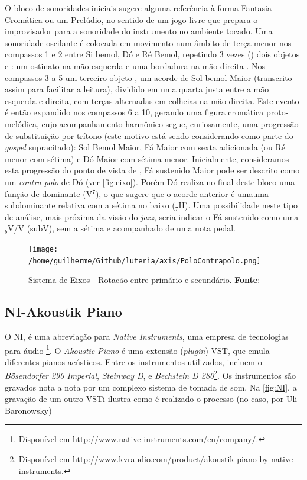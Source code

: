 O bloco de sonoridades iniciais  sugere alguma referência à forma Fantasia Cromática ou um Prelúdio, no sentido de um jogo livre que prepara o improvisador para a sonoridade do instrumento no ambiente tocado.  Uma sonoridade oscilante é colocada em movimento num âmbito de terça menor nos compassos 1 e 2 entre Si bemol, Dó e Ré Bemol, repetindo 3 vezes () dois objetos  e : um ostinato na mão esquerda e uma bordadura na mão direita . Nos compassos 3 a 5 um terceiro objeto , um acorde de Sol bemol Maior (transcrito assim para facilitar a leitura), dividido em uma quarta justa entre a mão esquerda e direita, com terças alternadas em colheias na mão direita. Este evento é então expandido nos compassos 6 a 10, gerando uma figura cromática proto-melódica, cujo acompanhamento harmônico segue, curiosamente, uma progressão de substituição por trítono (este motivo está sendo considerando como parte do  \emph{gospel} supracitado): Sol Bemol Maior, Fá Maior com sexta adicionada (ou Ré menor com sétima) e Dó Maior com sétima menor. Inicialmente, consideramos esta progressão do ponto de vista de , Fá sustenido Maior pode ser descrito como um \emph{contra-polo} de Dó (ver \autoref{fig:eixo}). Porém Dó realiza no final deste bloco uma função de dominante (V$^7$), o que sugere que o acorde anterior é umauma subdominante relativa com a sétima no baixo ($_7$II). Uma possibilidade neste tipo de análise, mais próxima da visão do \emph{jazz}, seria indicar o Fá sustenido como uma $_b$V/V (subV), sem a sétima e acompanhado de uma nota pedal. 

\begin{figure}[!h]
  \centering
  \texttt{[image: /home/guilherme/Github/luteria/axis/PoloContrapolo.png]}
  \caption{Sistema de Eixos - Rotacão entre primário e secundário. \textbf{Fonte}: }
  \label{fig:eixo}
\end{figure}

\subsection{NI-Akoustik Piano}\label{sec:NI}

O NI, é uma abreviação para \emph{Native Instruments}, uma empresa de tecnologias para áudio \footnote{Disponível em \url{http://www.native-instruments.com/en/company/}.}. O \emph{Akoustic Piano} é uma extensão (\emph{plugin}) VST, que emula diferentes pianos acústicos. Entre os instrumentos utilizados, incluem o \emph{Bösendorfer 290 Imperial}, \emph{Steinway D}, e \emph{Bechstein D 280}\footnote{Disponível em \url{http://www.kvraudio.com/product/akoustik-piano-by-native-instruments}.}. Os instrumentos são gravados nota a nota por um complexo sistema de tomada de som. Na \autoref{fig:NI}, a gravação de um outro VSTi ilustra como é realizado o processo (no caso, por Uli Baronowsky)

